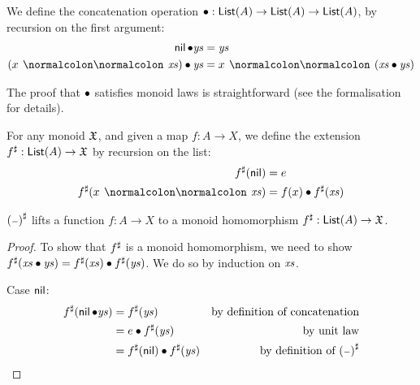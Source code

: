 \begin{toappendix}
    \begin{definition}
        We define the concatenation operation $\mathbin{\bullet} : \operatorname{\mathsf{List}}(A) \to \operatorname{\mathsf{List}}(A) \to \operatorname{\mathsf{List}}(A)$,
        by recursion on the first argument:
        \begin{align*}
            \nil \mult \ys          & = \ys                     \\
            (x \cons \xs) \mult \ys & = x \cons (\xs \mult \ys)
        \end{align*}
    \end{definition}
    The proof that $\mathbin{\bullet}$ satisfies monoid laws is straightforward (see the formalisation for details).

    \begin{definition}
        For any monoid $\mathfrak{X}$, and given a map $f : A \to X$,
        we define the extension ${f}^{\sharp} : \operatorname{\mathsf{List}}(A) \to \mathfrak{X}$ by recursion on the list:
        \begin{align*}
            \ext{f}(\nil)        & = e                       \\
            \ext{f}(x \cons \xs) & = f(x) \mult \ext{f}(\xs)
        \end{align*}
    \end{definition}

    \begin{proposition}
        $\ext{(\blank)}$ lifts a function $f : A \to X$ to a monoid homomorphism ${f}^{\sharp} : \operatorname{\mathsf{List}}(A) \to \mathfrak{X}$.
    \end{proposition}

    \begin{proof}
        To show that ${f}^{\sharp}$ is a monoid homomorphism,
        we need to show ${f}^{\sharp}(\mathit{xs} \mathbin{\bullet} \mathit{ys}) = {f}^{\sharp}(\mathit{xs}) \mathbin{\bullet} {f}^{\sharp}(\mathit{ys})$.
        We do so by induction on $\mathit{xs}$.

        Case $\operatorname{\mathsf{nil}}$:
        \begin{align*}
            \ext{f}(\nil \mult \ys)
             & = \ext{f}(\ys)                     & \text{by definition of concatenation}    \\
             & = e \mult \ext{f}(\ys)             & \text{by unit law}                       \\
             & = \ext{f}(\nil) \mult \ext{f}(\ys) & \text{by definition of $\ext{(\blank)}$}
        \end{align*}


\end{proof}
\end{toappendix}
